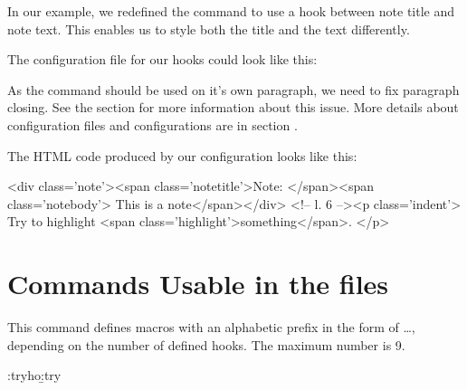In our example, we redefined the  command to use a hook between note title
and note text. This enables us to style both the title and the text differently.


The configuration file for our hooks could look like this:

\begin{texsource}
{\ifvmode\IgnorePar\fi\EndP{}}
{}
{}


\EndPreamble
\end{texsource}

As the  command should be used on it's own paragraph, we need to 
fix paragraph closing. See the  section for
more information about this issue. More details about configuration files and configurations are
in section .

The HTML code produced by our configuration looks like this:

\begin{htmlsource}
<div class='note'><span class='notetitle'>Note: </span><span class='notebody'> This is a note</span></div>
<!--  l. 6  --><p class='indent'>   Try to highlight <span class='highlight'>something</span>.
</p>
\end{htmlsource}


\section{Commands Usable in the  files}


This command defines macros with an alphabetic prefix in the form of 
 \ldots {}, depending on the number of defined hooks.
The maximum number is 9.

\begin{texsource}
\def\try#1{\a:try#1\b:try}
\try{ho} 
\end{texsource}


